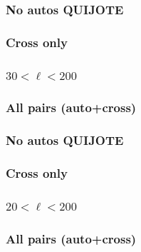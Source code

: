 

\subsubsection*{No autos QUIJOTE}




\subsubsection*{Cross only}




\clearpage

\subsubsection*{$30 < \ell < 200$}

\subsubsection*{All pairs (auto+cross)}



\subsubsection*{No autos QUIJOTE}



\subsubsection*{Cross only}



\clearpage

\subsubsection*{$20 < \ell < 200$}

\subsubsection*{All pairs (auto+cross)}

